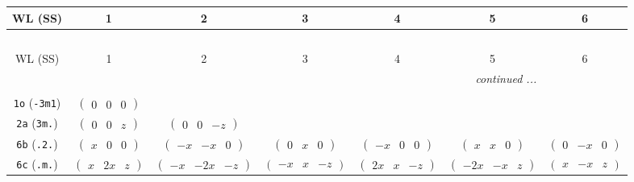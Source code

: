 \documentclass[fleqn,9pt,landscape]{jsarticle}
\begin{document}
\begin{center}
\renewcommand{\arraystretch}{1.2}
\begin{longtable}{ccccccc}
 \hline \hline
WL (SS) & 1 & 2 & 3 & 4 & 5 & 6 \\ \hline \endfirsthead

\multicolumn{6}{l}{\tablename\ \thetable{}} \\
 \hline \hline
WL (SS) & 1 & 2 & 3 & 4 & 5 & 6 \\ \hline \endhead

 \hline \hline
\multicolumn{6}{r}{\footnotesize\it continued ...} \\ \endfoot

 \hline \hline
\multicolumn{6}{r}{} \\ \endlastfoot

{\tt 1o} ({\tt -3m1}) & $ \begin{pmatrix} 0 & 0 & 0 \end{pmatrix} $ & $  $ & $  $ & $  $ & $  $ & $  $ \\ \hline
{\tt 2a} ({\tt 3m.}) & $ \begin{pmatrix} 0 & 0 & z \end{pmatrix} $ & $ \begin{pmatrix} 0 & 0 & - z \end{pmatrix} $ & $  $ & $  $ & $  $ & $  $ \\ \hline
{\tt 6b} ({\tt .2.}) & $ \begin{pmatrix} x & 0 & 0 \end{pmatrix} $ & $ \begin{pmatrix} - x & - x & 0 \end{pmatrix} $ & $ \begin{pmatrix} 0 & x & 0 \end{pmatrix} $ & $ \begin{pmatrix} - x & 0 & 0 \end{pmatrix} $ & $ \begin{pmatrix} x & x & 0 \end{pmatrix} $ & $ \begin{pmatrix} 0 & - x & 0 \end{pmatrix} $ \\ \hline
{\tt 6c} ({\tt .m.}) & $ \begin{pmatrix} x & 2 x & z \end{pmatrix} $ & $ \begin{pmatrix} - x & - 2 x & - z \end{pmatrix} $ & $ \begin{pmatrix} - x & x & - z \end{pmatrix} $ & $ \begin{pmatrix} 2 x & x & - z \end{pmatrix} $ & $ \begin{pmatrix} - 2 x & - x & z \end{pmatrix} $ & $ \begin{pmatrix} x & - x & z \end{pmatrix} $ \\ \hline

\end{longtable}
\end{center}
\end{document}
